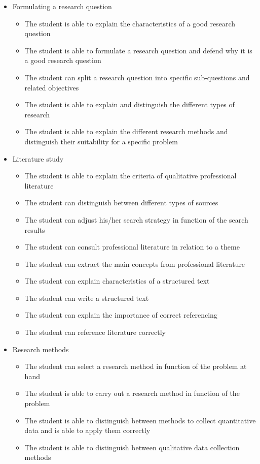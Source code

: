\begin{itemize}
  \item Formulating a research question
        \begin{itemize}           
          \item The student is able to explain the characteristics of a good research question
          \item The student is able to formulate a research question and defend why it is a good research question
          \item The student can split a research question into specific sub-questions and related objectives
          \item The student is able to explain and distinguish the different types of research
          \item The student is able to explain the different research methods and distinguish their suitability for a specific problem
        \end{itemize}

  \item Literature study
        \begin{itemize}               
          \item The student is able to explain the criteria of qualitative professional literature
          \item The student can distinguish between different types of sources
          \item The student can adjust his/her search strategy in function of the search results
          \item The student can consult professional literature in relation to a theme
          \item The student can extract the main concepts from professional literature
          \item The student can explain characteristics of a structured text
          \item The student can write a structured text
          \item The student can explain the importance of correct referencing
          \item The student can reference literature correctly
        \end{itemize}

  \item Research methods
        \begin{itemize}                  
          \item The student can select a research method in function of the problem at hand
          \item The student is able to carry out a research method in function of the problem 
          \item The student is able to distinguish between methods to collect quantitative data and is able to apply them correctly
          \item The student is able to distinguish between qualitative data collection methods 
        \end{itemize}


\end{itemize}
